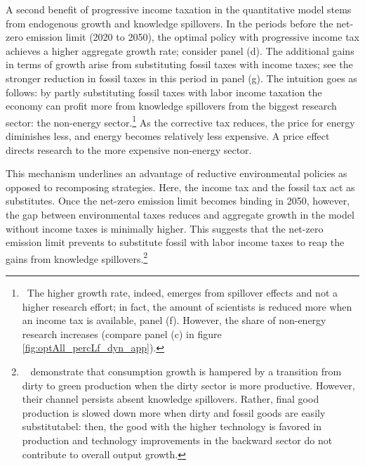 A second benefit of progressive income taxation in the quantitative model stems from endogenous growth and knowledge spillovers. 
In the periods before the net-zero emission limit (2020 to 2050), the optimal policy with progressive income tax achieves a higher aggregate growth rate; consider panel (d). The additional gains in terms of growth arise from substituting fossil taxes with income taxes; see the stronger reduction in fossil taxes in this period in panel (g).  The intuition goes as follows: by partly substituting fossil taxes with labor income taxation the economy can profit more from knowledge spillovers from the biggest research sector: the non-energy sector.\footnote{\ The higher growth rate, indeed, emerges from spillover effects and not a higher research effort; in fact, the amount of scientists is reduced more when an income tax is available, panel (f). However, the share of non-energy research increases (compare panel (c) in figure \ref{fig:optAll_percLf_dyn_app}). }
As the corrective tax reduces, the price for energy diminishes less, and energy becomes relatively less expensive. A price effect directs research to the more expensive non-energy sector. %


 This mechanism underlines an advantage of reductive environmental policies as opposed to recomposing strategies. Here, the income tax and the fossil tax act as substitutes.  %
Once the net-zero emission limit becomes binding in 2050, however, the gap between environmental taxes reduces and aggregate growth in the model without income taxes is minimally higher.   This suggests that the net-zero emission limit prevents to substitute fossil with labor income taxes to reap the gains from knowledge spillovers.\footnote{\ \cite{Acemoglu2012TheChange} demonstrate that consumption growth is hampered by a transition from dirty to green production when the dirty sector is more productive. However, their channel persists absent knowledge spillovers. Rather, final good production is slowed down more when dirty and fossil goods are easily substitutabel: then, the good with the higher technology is favored in production and technology improvements in the backward sector do not contribute to overall output growth.} 

